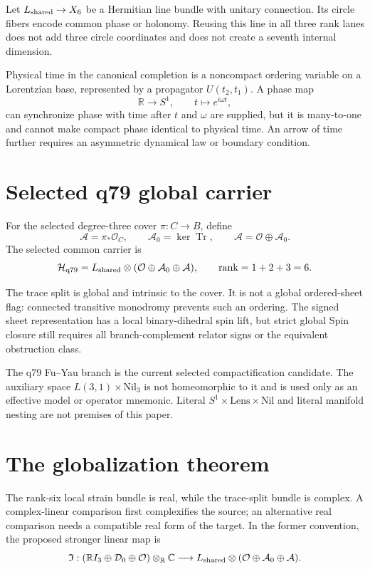 \documentclass[11pt]{article}
\begin{document}
Let $L_{\rm shared}\to X_6$ be a Hermitian line bundle with unitary connection.
Its circle fibers encode common phase or holonomy.  Reusing this line in all
three rank lanes does not add three circle coordinates and does not create a
seventh internal dimension.

Physical time in the canonical completion is a noncompact ordering variable
on a Lorentzian base, represented by a propagator $U(t_2,t_1)$.  A phase map
\[
 \mathbb R\longrightarrow S^1,
 \qquad t\longmapsto e^{i\omega t},
\]
can synchronize phase with time after $t$ and $\omega$ are supplied, but it is
many-to-one and cannot make compact phase identical to physical time.  An
arrow of time further requires an asymmetric dynamical law or boundary
condition.

\section{Selected q79 global carrier}

For the selected degree-three cover $\pi:C\to B$, define
\[
 \mathcal A=\pi_*\mathcal O_C,
 \qquad
 \mathcal A_0=\ker\operatorname{Tr},
 \qquad
 \mathcal A=\mathcal O\oplus\mathcal A_0.
\]
The selected common carrier is
\[
 \mathcal H_{\rm q79}
 =L_{\rm shared}\otimes
 (\mathcal O\oplus\mathcal A_0\oplus\mathcal A),
 \qquad \operatorname{rank}=1+2+3=6.
\]

The trace split is global and intrinsic to the cover.  It is not a global
ordered-sheet flag: connected transitive monodromy prevents such an ordering.
The signed sheet representation has a local binary-dihedral spin lift, but
strict global Spin closure still requires all branch-complement relator signs
or the equivalent obstruction class.

The q79 Fu--Yau branch is the current selected compactification candidate.
The auxiliary space $L(3,1)\times\mathrm{Nil}_3$ is not homeomorphic to it and
is used only as an effective model or operator mnemonic.  Literal
$S^1\times\mathrm{Lens}\times\mathrm{Nil}$ and literal manifold nesting are
not premises of this paper.

\section{The globalization theorem}
\label{sec:linear-contract}

The rank-six local strain bundle is real, while the trace-split bundle is
complex. A complex-linear comparison first complexifies the source; an
alternative real comparison needs a compatible real form of the target.
In the former convention, the proposed stronger linear map is
\[
 \mathfrak I:
 (\mathbb RI_3\oplus\mathcal D_0\oplus\mathcal O)\otimes_{\mathbb R}\mathbb C
 \longrightarrow
 L_{\rm shared}\otimes
 (\mathcal O\oplus\mathcal A_0\oplus\mathcal A).
\]
\end{document}
